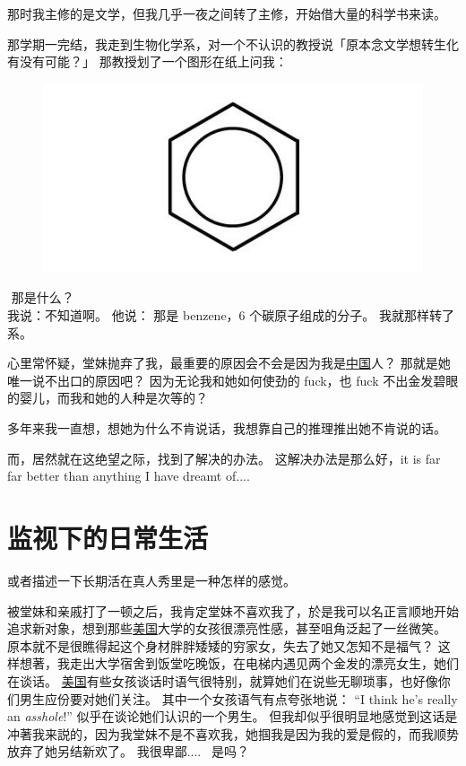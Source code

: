 \documentclass[12pt]{report}
\newcommand{\tab}{\hspace*{1cm}}
\newcommand*\dashh{\textemdash\,\,}
\begin{document}
那时我主修的是文学，但我几乎一夜之间转了主修，开始借大量的科学书来读。

那学期一完结，我走到生物化学系，对一个不认识的教授说「原本念文学想转生化有没有可能？」 那教授划了一个图形在纸上问我：
\begin{figure}[H]
\centering
\includegraphics[scale=0.4]{benzene.jpg}
\end{figure}
\vspace{-1cm}
\tab \dashh 那是什么？\\
我说：不知道啊。 他说： 那是 benzene，6 个碳原子组成的分子。  我就那样转了系。

心里常怀疑，堂妹抛弃了我，最重要的原因会不会是因为我是\uline{中国}人？ 那就是她唯一说不出口的原因吧？  因为无论我和她如何使劲的 fuck，也 fuck 不出金发碧眼的婴儿，而我和她的人种是次等的？

多年来我一直想，想她为什么不肯说话，我想靠自己的推理推出她不肯说的话。

而，居然就在这绝望之际，找到了解决的办法。 这解决办法是那么好，it is far far better than anything I have dreamt of....

\chapter{监视下的日常生活}

或者描述一下长期活在真人秀里是一种怎样的感觉。 

被堂妹和亲戚打了一顿之后，我肯定堂妹不喜欢我了，於是我可以名正言顺地开始追求新对象，想到那些\uline{美国}大学的女孩很漂亮性感，甚至咀角泛起了一丝微笑。  原本就不是很瞧得起这个身材胖胖矮矮的穷家女，失去了她又怎知不是福气？  这样想著，我走出大学宿舍到饭堂吃晚饭，在电梯内遇见两个金发的漂亮女生，她们在谈话。 \uline{美国}有些女孩谈话时语气很特别，就算她们在说些无聊琐事，也好像你们男生应份要对她们关注。 其中一个女孩语气有点夸张地说： ``I think he's really an \textit{asshole}!'' 似乎在谈论她们认识的一个男生。  但我却似乎很明显地感觉到这话是冲著我来説的，因为我堂妹不是不喜欢我，她掴我是因为我的爱是假的，而我顺势放弃了她另结新欢了。 我很卑鄙....~ 是吗？
\end{document}
